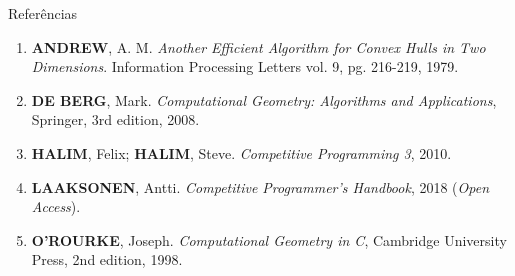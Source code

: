 \begin{frame}[fragile]{Referências}

    \begin{enumerate}

        \item \textbf{ANDREW}, A. M. \textit{Another Efficient Algorithm for Convex Hulls in Two Dimensions}. Information Processing Letters vol. 9, pg. 216-219, 1979.

        \item \textbf{DE BERG}, Mark. \textit{Computational Geometry: Algorithms and Applications}, Springer, 3rd edition, 2008.

        \item \textbf{HALIM}, Felix; \textbf{HALIM}, Steve. \textit{Competitive Programming 3}, 2010.
        \item \textbf{LAAKSONEN}, Antti. \textit{Competitive Programmer's Handbook}, 2018 (\textit{Open Access}).

        \item \textbf{O'ROURKE}, Joseph. \textit{Computational Geometry in C}, Cambridge University Press, 2nd edition, 1998. 

    \end{enumerate}

\end{frame}
